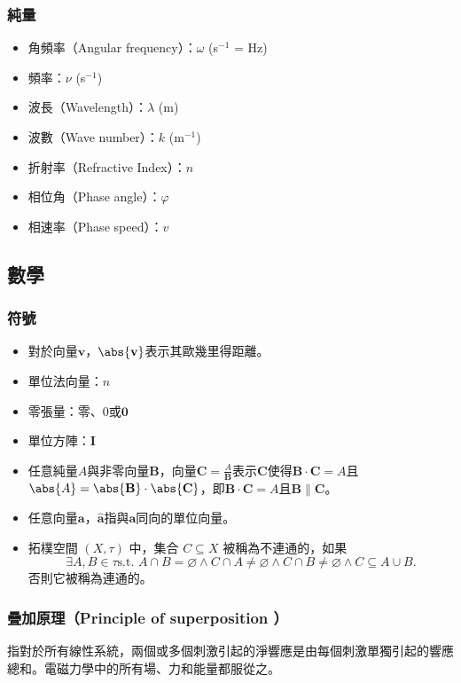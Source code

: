 \documentclass[a4paper,12pt]{report}
\begin{document}
\begin{itemize}
\subsubsection{純量}
\begin{itemize}
\item 角頻率（Angular frequency）：$\omega$ (s$^{-1}$ = Hz)
\item 頻率：$\nu$ (s$^{-1}$)
\item 波長（Wavelength）：$\lambda$ (m)
\item 波數（Wave number）：$k$ (m$^{-1}$)
\item 折射率（Refractive Index）：$n$
\item 相位角（Phase angle）：$\varphi$
\item 相速率（Phase speed）：$v$
\end{itemize}
\subsection{數學}
\subsubsection{符號}
\begin{itemize}
\item 對於向量$\mathbf{v}$，$\abs{\mathbf{v}}$表示其歐幾里得距離。
\item 單位法向量：$\hat{n}$
\item 零張量：零、$0$或$\mathbf{0}$
\item 單位方陣：$\mathbf{I}$
\item 任意純量$A$與非零向量$\mathbf{B}$，向量$\mathbf{C}=\frac{A}{\mathbf{B}}$表示$\mathbf{C}$使得$\mathbf{B}\cdot \mathbf{C}=A$且$\abs{A}=\abs{\mathbf{B}}\cdot \abs{\mathbf{C}}$，即$\mathbf{B}\cdot \mathbf{C}=A$且$\mathbf{B}\parallel\mathbf{C}$。
\item 任意向量$\mathbf{a}$，$\hat{\mathbf{a}}$指與$\mathbf{a}$同向的單位向量。
\item 拓樸空間 $(X,\tau)$ 中，集合 $C\subseteq X$ 被稱為不連通的，如果
\[\exists A,B\in\tau\text{s.t. }A\cap B=\varnothing\land C\cap A\neq\varnothing\land C\cap B\neq\varnothing\land C\subseteq A\cup B.\]
否則它被稱為連通的。
\end{itemize}
\subsubsection{疊加原理（Principle of superposition ）}
指對於所有線性系統，兩個或多個刺激引起的淨響應是由每個刺激單獨引起的響應總和。電磁力學中的所有場、力和能量都服從之。

\end{itemize}
\end{document}
